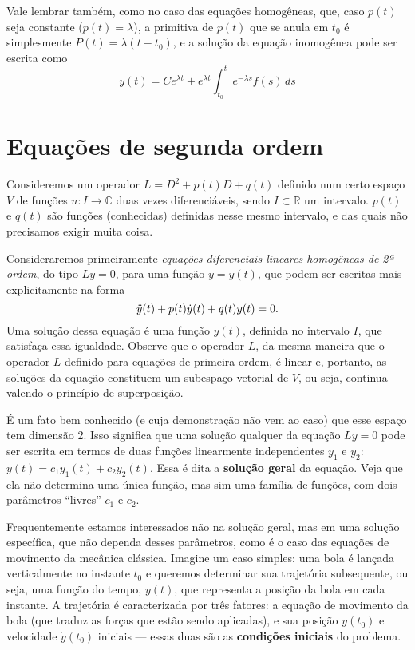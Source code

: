 \documentclass[12pt,a4paper,oneside]{memoir}
\newcommand{\C}{\mathbb{C}}
\newcommand{\R}{\mathbb{R}}
\begin{document}
Vale lembrar também, como no caso das equações homogêneas, que, caso $p(t)$ seja constante ($p(t) = \lambda$), a primitiva de $p(t)$ que se anula em $t_0$ é simplesmente $P(t) = \lambda(t - t_0)$, e a solução da equação inomogênea pode ser escrita como
\begin{equation}
\label{edo1ic-sol}
  y(t) = C e^{\lambda t} + e^{\lambda t} \int_{t_0}^{t} e^{-\lambda s} f(s)\,ds
\end{equation}

\chapter{Equações de segunda ordem}

Consideremos um operador $L = D^2 + p(t) D + q(t)$ definido num certo espaço $V$ de funções $u : I \to \C$ duas vezes diferenciáveis, sendo $I \subset \R$ um intervalo.  $p(t)$ e $q(t)$ são funções (conhecidas) definidas nesse mesmo intervalo, e das quais não precisamos exigir muita coisa.

Consideraremos primeiramente \emph{equações diferenciais lineares homogêneas de 2ª ordem}, do tipo $Ly = 0$, para uma função $y = y(t)$, que podem ser escritas mais explicitamente na forma
\begin{equation}
  \label{edo2-funcao}
    \ddot{y}(t) + p(t) \dot{y}(t) + q(t) y(t) = 0
  \text.
\end{equation}
Uma solução dessa equação é uma função $y(t)$, definida no intervalo $I$, que satisfaça essa igualdade.  Observe que o operador $L$, da mesma maneira que o operador $L$ definido para equações de primeira ordem, é linear e, portanto, as soluções da equação constituem um subespaço vetorial de $V$, ou seja, continua valendo o princípio de superposição.

É um fato bem conhecido (e cuja demonstração não vem ao caso) que esse espaço tem dimensão 2.  Isso significa que uma solução qualquer da equação $Ly = 0$ pode ser escrita em termos de duas funções linearmente independentes $y_1$ e $y_2$: $y(t) = c_1 y_1(t) + c_2 y_2(t)$.  Essa é dita a \textbf{solução geral} da equação.  Veja que ela não determina uma única função, mas sim uma família de funções, com dois parâmetros ``livres'' $c_1$ e $c_2$.

Frequentemente estamos interessados não na solução geral, mas em uma solução específica, que não dependa desses parâmetros, como é o caso das equações de movimento da mecânica clássica.  Imagine um caso simples: uma bola é lançada verticalmente no instante $t_0$ e queremos determinar sua trajetória subsequente, ou seja, uma função do tempo, $y(t)$, que representa a posição da bola em cada instante.  A trajetória é caracterizada por três fatores: a equação de movimento da bola (que traduz as forças que estão sendo aplicadas), e sua posição $y(t_0)$ e velocidade $\dot{y}(t_0)$ iniciais --- essas duas são as \textbf{condições iniciais} do problema.
\end{document}
